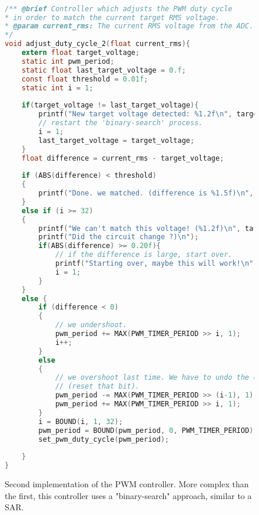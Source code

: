 \begin{figure}[h]
\begin{lstlisting}[language=C, frame=single, basicstyle=\small, tabsize=2, showstringspaces=false]

/** @brief Controller which adjusts the PWM duty cycle
* in order to match the current target RMS voltage.
* @param current_rms: The current RMS voltage from the ADC.
*/
void adjust_duty_cycle_2(float current_rms){
	extern float target_voltage;
	static int pwm_period;	
	static float last_target_voltage = 0.f;
	const float threshold = 0.01f;
	static int i = 1;	
	
	if(target_voltage != last_target_voltage){
		printf("New target voltage detected: %1.2f\n", target_voltage);
		// restart the 'binary-search' process.
		i = 1;
		last_target_voltage = target_voltage;
	}
	float difference = current_rms - target_voltage;
	
	if (ABS(difference) < threshold)
	{
		printf("Done. we matched. (difference is %1.5f)\n", difference);
	}
	else if (i >= 32)
	{
		printf("We can't match this voltage! (%1.2f)\n", target_voltage);
		printf("Did the circuit change ?)\n"); 
		if(ABS(difference) >= 0.20f){
			// if the difference is large, start over.
			printf("Starting over, maybe this will work!\n");
			i = 1;
		}
	}
	else {
		if (difference < 0)
		{
			// we undershoot.
			pwm_period += MAX(PWM_TIMER_PERIOD >> i, 1);
			i++;
		}
		else
		{
			// we overshoot last time. We have to undo the change we did last time
			// (reset that bit). 
			pwm_period -= MAX(PWM_TIMER_PERIOD >> (i-1), 1);
			pwm_period += MAX(PWM_TIMER_PERIOD >> i, 1);
		}
		i = BOUND(i, 1, 32);
		pwm_period = BOUND(pwm_period, 0, PWM_TIMER_PERIOD);
		set_pwm_duty_cycle(pwm_period);
	
	}
}
\end{lstlisting}
\caption{\label{fig:pwm_controller_2_logic} Second implementation of the PWM controller. More complex than the first, this controller uses a "binary-search" approach, similar to a SAR.}
\end{figure}